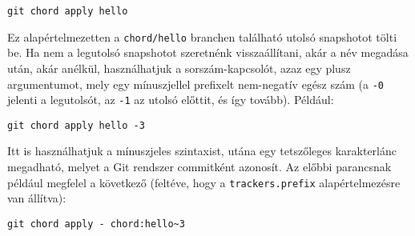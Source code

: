 \documentclass[final]{elteikthesis}[2025/03/25]
\begin{document}
\begin{verbatim}
git chord apply hello
\end{verbatim}

Ez alapértelmezetten a \verb|chord/hello| branchen található utolsó snapshotot tölti be.
Ha nem a legutolsó snapshotot szeretnénk visszaállítani, akár a név megadása után, akár anélkül,
használhatjuk a sorszám-kapcsolót, azaz egy plusz argumentumot, mely egy mínuszjellel prefixelt nem-negatív egész szám
(a \verb|-0| jelenti a legutolsót, az \verb|-1| az utolsó előttit, és így tovább).
Például:

\begin{verbatim}
git chord apply hello -3
\end{verbatim}

Itt is használhatjuk a mínuszjeles szintaxist, utána egy tetszőleges karakterlánc megadható,
melyet a Git rendszer commitként azonosít.
Az előbbi parancsnak például megfelel a következő (feltéve, hogy a \verb|trackers.prefix| alapértelmezésre van állítva):

\begin{verbatim}
git chord apply - chord:hello~3
\end{verbatim}
\end{document}

